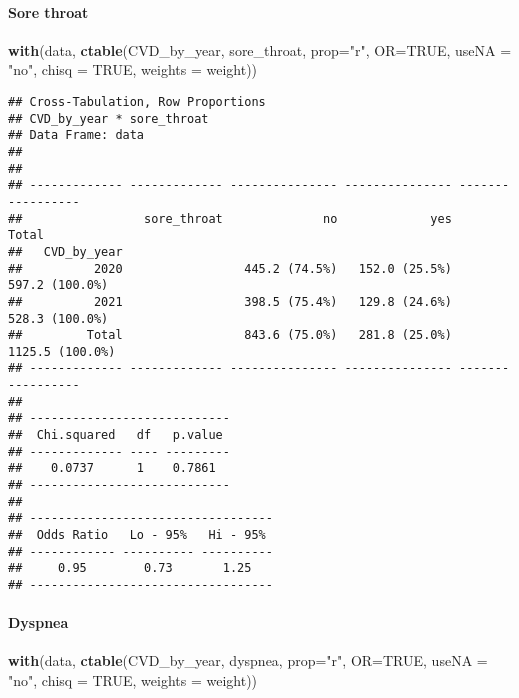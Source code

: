 \documentclass[
]{article}
\newenvironment{Shaded}{\begin{snugshade}}{\end{snugshade}}
\newcommand{\AttributeTok}[1]{\textcolor[rgb]{0.13,0.29,0.53}{#1}}
\newcommand{\ConstantTok}[1]{\textcolor[rgb]{0.56,0.35,0.01}{#1}}
\newcommand{\FunctionTok}[1]{\textcolor[rgb]{0.13,0.29,0.53}{\textbf{#1}}}
\newcommand{\NormalTok}[1]{#1}
\newcommand{\StringTok}[1]{\textcolor[rgb]{0.31,0.60,0.02}{#1}}
\begin{document}
\hypertarget{sore-throat-1}{%
\paragraph{\texorpdfstring{{ Sore throat
}}{ Sore throat }}\label{sore-throat-1}}

\begin{Shaded}
\begin{Highlighting}[]
\FunctionTok{with}\NormalTok{(data, }\FunctionTok{ctable}\NormalTok{(CVD\_by\_year, sore\_throat, }\AttributeTok{prop=}\StringTok{"r"}\NormalTok{, }\AttributeTok{OR=}\ConstantTok{TRUE}\NormalTok{, }\AttributeTok{useNA =} \StringTok{"no"}\NormalTok{, }\AttributeTok{chisq =} \ConstantTok{TRUE}\NormalTok{, }\AttributeTok{weights =}\NormalTok{ weight))}
\end{Highlighting}
\end{Shaded}

\begin{verbatim}
## Cross-Tabulation, Row Proportions  
## CVD_by_year * sore_throat  
## Data Frame: data  
## 
## 
## ------------- ------------- --------------- --------------- -----------------
##                 sore_throat              no             yes             Total
##   CVD_by_year                                                                
##          2020                 445.2 (74.5%)   152.0 (25.5%)    597.2 (100.0%)
##          2021                 398.5 (75.4%)   129.8 (24.6%)    528.3 (100.0%)
##         Total                 843.6 (75.0%)   281.8 (25.0%)   1125.5 (100.0%)
## ------------- ------------- --------------- --------------- -----------------
## 
## ----------------------------
##  Chi.squared   df   p.value 
## ------------- ---- ---------
##    0.0737      1    0.7861  
## ----------------------------
## 
## ----------------------------------
##  Odds Ratio   Lo - 95%   Hi - 95% 
## ------------ ---------- ----------
##     0.95        0.73       1.25   
## ----------------------------------
\end{verbatim}

\hypertarget{dyspnea-1}{%
\paragraph{\texorpdfstring{{ Dyspnea }}{ Dyspnea }}\label{dyspnea-1}}

\begin{Shaded}
\begin{Highlighting}[]
\FunctionTok{with}\NormalTok{(data, }\FunctionTok{ctable}\NormalTok{(CVD\_by\_year, dyspnea, }\AttributeTok{prop=}\StringTok{"r"}\NormalTok{, }\AttributeTok{OR=}\ConstantTok{TRUE}\NormalTok{, }\AttributeTok{useNA =} \StringTok{"no"}\NormalTok{, }\AttributeTok{chisq =} \ConstantTok{TRUE}\NormalTok{, }\AttributeTok{weights =}\NormalTok{ weight))}
\end{Highlighting}
\end{Shaded}
\end{document}
